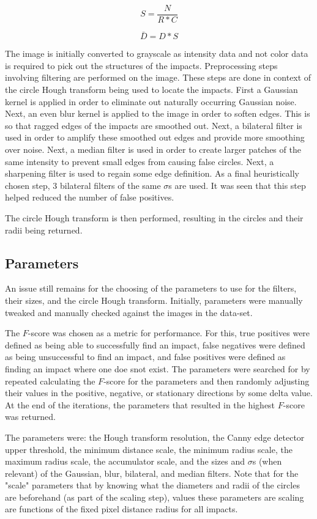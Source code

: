\documentclass{article}
\begin{document}
\[S = \frac{N}{R * C}\]

\[\bar{D} = D * S\]

The image is initially converted to grayscale as intensity data and not color data is required
to pick out the structures of the impacts.
Preprocessing steps involving filtering are performed on the image. These steps are done
in context of the circle Hough transform being used to locate the impacts.
First a Gaussian kernel is applied in order to eliminate out naturally occurring Gaussian noise.
Next, an even blur kernel is applied to the image in order to soften edges. This is so that
ragged edges of the impacts are smoothed out.
Next, a bilateral filter is used in order to amplify these smoothed out edges and provide 
more smoothing over noise.
Next, a median filter is used in order to create larger patches of the same intensity to 
prevent small edges from causing false circles.
Next, a sharpening filter is used to regain some edge definition.
As a final heuristically chosen step, 3 bilateral filters of the same \(\sigma{}\)s are used.
It was seen that this step helped reduced the number of false positives.

The circle Hough transform is then performed, resulting in the circles and their radii being returned.

\subsection{Parameters}
\label{ssec:parameters}
An issue still remains for the choosing of the parameters to use for the filters, their sizes, and
the circle Hough transform. Initially, parameters were manually tweaked and manually checked against
the images in the data-set.

The \(F\)-score was chosen as a metric for performance. For this, true positives
were defined as being able to successfully find an impact, false negatives were defined as
being unsuccessful to find an impact, and false positives were defined as finding an impact
where one doe snot exist.
The parameters were searched for by repeated calculating the \(F\)-score for the parameters and then
randomly adjusting their values in the positive, negative, or stationary directions by some
delta value.
At the end of the iterations, the parameters that resulted in the highest \(F\)-score was returned.

The parameters were: the Hough transform resolution, the Canny edge detector upper threshold, the minimum
distance scale, the minimum radius scale, the maximum radius scale, the accumulator scale, and the
sizes and \(\sigma{}\)s (when relevant) of the Gaussian, blur, bilateral, and median filters.
Note that for the "scale" parameters that by knowing what the diameters and radii of the circles
are beforehand (as part of the scaling step), values these parameters are scaling are functions
of the fixed pixel distance radius for all impacts.
\end{document}
